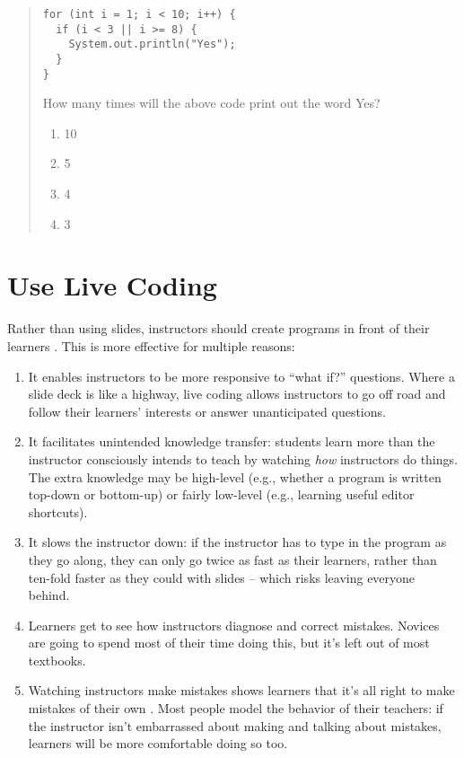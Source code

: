 \begin{quote}
\begin{verbatim}
for (int i = 1; i < 10; i++) {
  if (i < 3 || i >= 8) {
    System.out.println("Yes");
  }
}
\end{verbatim}

How many times will the above code print out the word Yes?

\begin{enumerate}
\item 10
\item 5
\item 4
\item 3
\end{enumerate}
\end{quote}

\section*{Use Live Coding}

Rather than using slides, instructors should create programs in front
of their learners \cite{Rubi2013}.  This is more effective for
multiple reasons:

\begin{enumerate}

\item
  It enables instructors to be more responsive to ``what if?''
  questions. Where a slide deck is like a highway, live coding allows
  instructors to go off road and follow their learners' interests or
  answer unanticipated questions.

\item
  It facilitates unintended knowledge transfer: students learn more
  than the instructor consciously intends to teach by watching
  \emph{how} instructors do things.  The extra knowledge may be
  high-level (e.g., whether a program is written top-down or
  bottom-up) or fairly low-level (e.g., learning useful editor
  shortcuts).

\item
  It slows the instructor down: if the instructor has to type in the
  program as they go along, they can only go twice as fast as their
  learners, rather than ten-fold faster as they could with slides --
  which risks leaving everyone behind.

\item
  Learners get to see how instructors diagnose and correct
  mistakes. Novices are going to spend most of their time doing this,
  but it's left out of most textbooks.

\item
  Watching instructors make mistakes shows learners that it's all
  right to make mistakes of their own \cite{Bark2005}.  Most people
  model the behavior of their teachers: if the instructor isn't
  embarrassed about making and talking about mistakes, learners will
  be more comfortable doing so too.

\end{enumerate}

